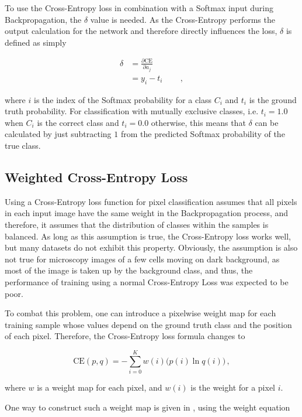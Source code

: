 \noindent To use the Cross-Entropy loss in combination with a Softmax input during Backpropagation, the $\delta$ value is needed. As the Cross-Entropy performs the output calculation for the network and therefore directly influences the loss, $\delta$ is defined as simply

\begin {align} \delta &= \frac{\partial \text{CE}}{\partial a_j}\\  
			    &= y_i - t_i \hspace{2em} \,,
\end {align}

\noindent where $i$ is the index of the Softmax probability for a class $C_i$ and $t_i$ is the ground truth probability. \cite[]{bishop_pattern} For classification with mutually exclusive classes, i.e. $t_i = 1.0$ when $C_i$ is the correct class and $t_i = 0.0$ otherwise, this means that $\delta$ can be calculated by just subtracting $1$ from the predicted Softmax probability of the true class.


		\subsection{Weighted Cross-Entropy Loss}

Using a Cross-Entropy loss function for pixel classification assumes that all pixels in each input image have the same weight in the Backpropagation process, and therefore, it assumes that the distribution of classes within the samples is balanced. As long as this assumption is true, the Cross-Entropy loss works well, but many datasets do not exhibit this property. Obviously, the assumption is also not true for microscopy images of a few cells moving on dark background, as most of the image is taken up by the background class, and thus, the performance of training using a normal Cross-Entropy Loss was expected to be poor.

To combat this problem, one can introduce a pixelwise weight map for each training sample whose values depend on the ground truth class and the position of each pixel. Therefore, the Cross-Entropy loss formula changes to

\[ \text{CE}(p, q) = -\sum \limits_{i = 0}^{K} w(i) \bigg ( p(i) \ln q(i) \bigg ) \,, \]

\noindent where $w$ is a weight map for each pixel, and $w(i)$ is the weight for a pixel $i$.

One way to construct such a weight map is given in \cite{unet}, using the weight equation

